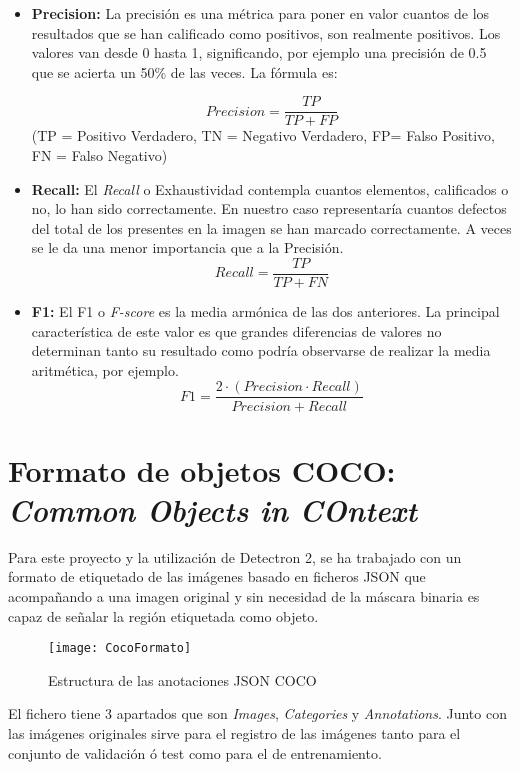 \begin{itemize}
    \item \textbf{Precision:} La precisión es una métrica para poner en valor cuantos de los resultados que se han calificado como positivos, son realmente positivos. Los valores van desde 0 hasta 1, significando, por ejemplo una precisión de 0.5 que se acierta un 50\% de las veces.
    La fórmula es:
    
    \[
    Precision = \frac{TP}{TP+FP}
    \]
    \centering(TP = Positivo Verdadero, TN = Negativo Verdadero, FP= Falso Positivo, FN = Falso Negativo)
    
    \item \textbf{Recall:} El \emph{Recall} o Exhaustividad contempla cuantos elementos, calificados o no, lo han sido correctamente. En nuestro caso representaría cuantos defectos del total de los presentes en la imagen se han marcado correctamente. A veces se le da una menor importancia que a la Precisión.
        \[
    Recall = \frac{TP}{TP+FN}
    \]
    
    \item \textbf{F1:} El F1 o \emph{F-score} es la media armónica de las dos anteriores. La principal característica de este valor es que grandes diferencias de valores no determinan tanto su resultado como podría observarse de realizar la media aritmética, por ejemplo.
    \[
    F1 = \frac{2 \cdot (Precision \cdot Recall)}{Precision + Recall}
    \]
\end{itemize}

\clearpage

\section{Formato de objetos COCO: \emph{Common Objects in COntext} \label{TeoriaFormatoCOCO}} 
Para este proyecto y la utilización de Detectron 2, se ha trabajado con un formato de etiquetado de las imágenes basado en ficheros JSON que acompañando a una imagen original y sin necesidad de la máscara binaria es capaz de señalar la región etiquetada como objeto.

\begin{figure}[htb]
	\centering
	\texttt{[image: CocoFormato]}
	\caption[Estructura de las anotaciones JSON COCO]{Estructura de las anotaciones JSON COCO}
	\label{figuraAnotaciones}
\end{figure}

El fichero tiene 3 apartados que son \emph{Images}, \emph{Categories} y \emph{Annotations}. Junto con las imágenes originales sirve para el registro de las imágenes tanto para el conjunto de validación ó test como para el de entrenamiento.


